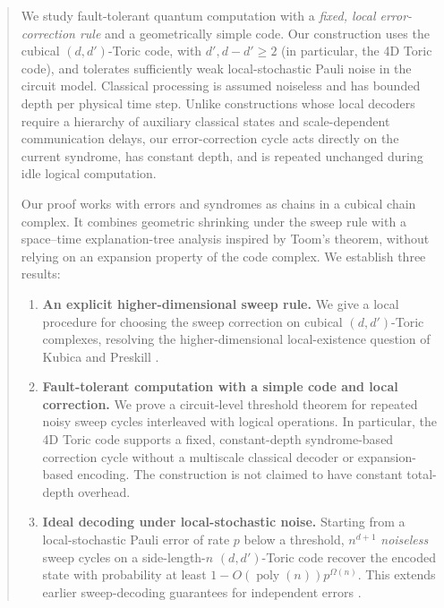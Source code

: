 \begin{abstract}
We study fault-tolerant quantum computation with a \emph{fixed, local error-correction rule} and a geometrically simple code. Our construction uses the cubical $(d,d')$-Toric code, with $d',d-d'\geq 2$ (in particular, the 4D Toric code), and tolerates sufficiently weak local-stochastic Pauli noise in the circuit model. Classical processing is assumed noiseless and has bounded depth per physical time step. Unlike constructions whose local decoders require a hierarchy of auxiliary classical states and scale-dependent communication delays, our error-correction cycle acts directly on the current syndrome, has constant depth, and is repeated unchanged during idle logical computation.

Our proof works with errors and syndromes as chains in a cubical chain complex. It combines geometric shrinking under the sweep rule with a space--time explanation-tree analysis inspired by Toom's theorem, without relying on an expansion property of the code complex. We establish three results:
\begin{enumerate}
    \item \textbf{An explicit higher-dimensional sweep rule.} We give a local procedure for choosing the sweep correction on cubical $(d,d')$-Toric complexes, resolving the higher-dimensional local-existence question of Kubica and Preskill \cite{Kubica_2019}.
    \item \textbf{Fault-tolerant computation with a simple code and local correction.} We prove a circuit-level threshold theorem for repeated noisy sweep cycles interleaved with logical operations. In particular, the 4D Toric code supports a fixed, constant-depth syndrome-based correction cycle without a multiscale classical decoder or expansion-based encoding. The construction is not claimed to have constant total-depth overhead.
    \item \textbf{Ideal decoding under local-stochastic noise.} Starting from a local-stochastic Pauli error of rate $p$ below a threshold, $n^{d+1}$ \emph{noiseless} sweep cycles on a side-length-$n$ $(d,d')$-Toric code recover the encoded state with probability at least $1-O(\operatorname{poly}(n))p^{\Omega(n)}$. This extends earlier sweep-decoding guarantees for independent errors \cite{Kubica_2019}.
\end{enumerate}
\end{abstract}
